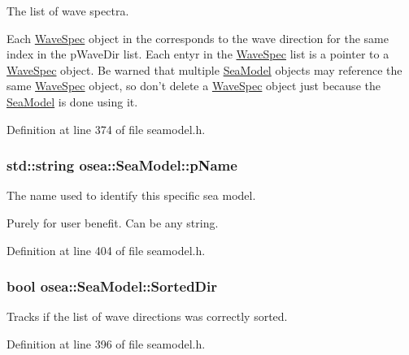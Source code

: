 The list of wave spectra. 

Each \hyperlink{classosea_1_1_wave_spec}{Wave\-Spec} object in the corresponds to the wave direction for the same index in the p\-Wave\-Dir list. Each entyr in the \hyperlink{classosea_1_1_wave_spec}{Wave\-Spec} list is a pointer to a \hyperlink{classosea_1_1_wave_spec}{Wave\-Spec} object. Be warned that multiple \hyperlink{classosea_1_1_sea_model}{Sea\-Model} objects may reference the same \hyperlink{classosea_1_1_wave_spec}{Wave\-Spec} object, so don't delete a \hyperlink{classosea_1_1_wave_spec}{Wave\-Spec} object just because the \hyperlink{classosea_1_1_sea_model}{Sea\-Model} is done using it. 

Definition at line 374 of file seamodel.\-h.

\hypertarget{classosea_1_1_sea_model_aea011a6daaf78caf7d008d7fd795432a}{
\subsubsection[{p\-Name}]{\setlength{\rightskip}{0pt plus 5cm}std\-::string osea\-::\-Sea\-Model\-::p\-Name\hspace{0.3cm}{\ttfamily [protected]}}}\label{classosea_1_1_sea_model_aea011a6daaf78caf7d008d7fd795432a}


The name used to identify this specific sea model. 

Purely for user benefit. Can be any string. 

Definition at line 404 of file seamodel.\-h.

\hypertarget{classosea_1_1_sea_model_a199be0a4bceaefdd36e30fcf7e4fe9f1}{
\subsubsection[{Sorted\-Dir}]{\setlength{\rightskip}{0pt plus 5cm}bool osea\-::\-Sea\-Model\-::\-Sorted\-Dir\hspace{0.3cm}{\ttfamily [protected]}}}\label{classosea_1_1_sea_model_a199be0a4bceaefdd36e30fcf7e4fe9f1}


Tracks if the list of wave directions was correctly sorted. 



Definition at line 396 of file seamodel.\-h.

